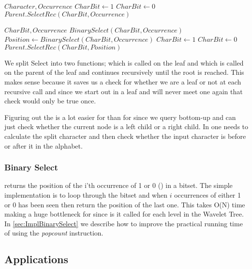 \begin{mdframed}[nobreak]
\begin{algorithmic} 
 {$Character, Occurrence$}
	\State $CharBit \gets 1$
\Else
	\State $CharBit \gets 0$
\EndIf
\State \Return $Parent.SelectRec(CharBit, Occurrence)$
\EndFunction
\end{algorithmic}
\end{mdframed}


\begin{mdframed}[nobreak]
\begin{algorithmic} 
 {$CharBit, Occurrence$}
	\State \Return $BinarySelect(CharBit, Occurrence)$
\EndIf
\State $Position \gets BinarySelect(CharBit, Occurrence)$
	\State $CharBit \gets 1$
\Else
	\State $CharBit \gets 0$
\EndIf
\State \Return $Parent.SelectRec(CharBit, Position)$
\EndFunction
\end{algorithmic}
\end{mdframed}


We split Select into two functions;  which is called on the leaf and  which is called on the parent of the leaf and continues recursively until the root is reached. 
This makes sense because it saves us a check for whether we are a leaf or not at each recursive call and since we start out in a leaf and will never meet one again that check would only be true once. 

Figuring out the  is a lot easier for  than for  since we query bottom-up and can just check whether the current node is a left child or a right child. 
In  one needs to calculate the split character and then check whether the input character is before or after it in the alphabet.

\subsubsection{Binary Select}
 returns the position of the i'th occurrence of 1 or 0 () in a bitset. 
The simple implementation is to loop through the bitset and when $i$ occurrences of either 1 or 0 has been seen then return the position of the last one. 
This takes O(N) time making  a huge bottleneck for  since is it called for each level in the Wavelet Tree. 
In \ref{sec:ImplBinarySelect} we describe how to improve the practical running time of  using the \textit{popcount} instruction.

\subsection{Applications}





